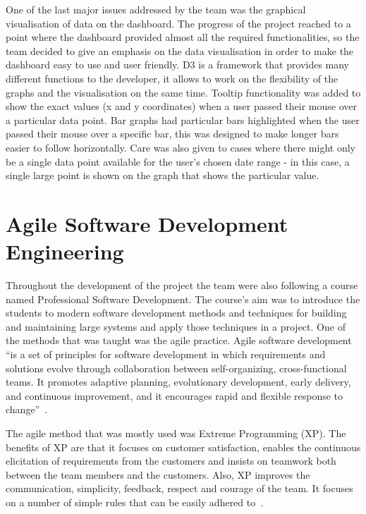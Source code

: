 \documentclass{l3proj}
\begin{document}
One of the last major issues addressed by the team was the graphical visualisation of data on the dashboard. The progress of the project reached to a point where the dashboard provided almost all the required functionalities, so the team decided to give an emphasis on the data visualisation in order to make the dashboard easy to use and user friendly. D3 is a framework that provides many different functions to the developer, it allows to work on the flexibility of the graphs and the visualisation on the same time. Tooltip functionality was added to show the exact values (x and y coordinates) when a user passed their mouse over a particular data point. Bar graphs had particular bars highlighted when the user passed their mouse over a specific bar, this was designed to make longer bars easier to follow horizontally. Care was also given to cases where there might only be a single data point available for the user's chosen date range - in this case, a single large point is shown on the graph that shows the particular value.

\section{Agile Software Development Engineering}
\label {sec:core-practices}

Throughout the development of the project the team were also following a course named Professional Software Development. The course's aim was to introduce the students to modern software development methods and techniques for building and maintaining large systems and apply those techniques in a project. One of the methods that was taught was the agile practice. Agile software development ``is a set of principles for software development in which requirements and solutions evolve through collaboration between self-organizing, cross-functional teams. It promotes adaptive planning, evolutionary development, early delivery, and continuous improvement, and it encourages rapid and flexible response to change''~\cite{AgileMethods}.

The agile method that was mostly used was Extreme Programming (XP). The benefits of XP are that it focuses on customer satisfaction, enables the continuous elicitation of requirements from the customers and insists on teamwork both between the team members and the customers. Also, XP improves the communication, simplicity, feedback, respect and courage of the team. It focuses on a number of simple rules that can be easily adhered to~\cite{ExtremeProgramming}.
\end{document}
